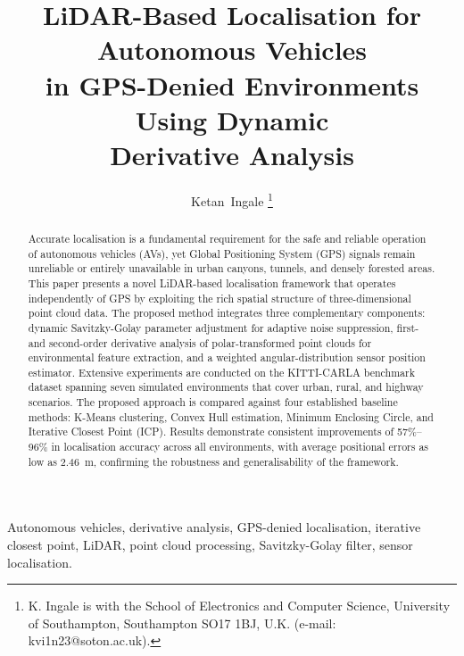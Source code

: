 \documentclass[lettersize,journal]{IEEEtran}
\begin{document}

\title{LiDAR-Based Localisation for Autonomous Vehicles\\
in GPS-Denied Environments Using Dynamic\\
Derivative Analysis}

\author{Ketan~Ingale
\thanks{K. Ingale is with the School of Electronics and Computer Science,
University of Southampton, Southampton SO17 1BJ, U.K.
(e-mail: kvi1n23@soton.ac.uk).}}

\maketitle

\begin{abstract}
Accurate localisation is a fundamental requirement for the safe and reliable operation of
autonomous vehicles (AVs), yet Global Positioning System (GPS) signals remain
unreliable or entirely unavailable in urban canyons, tunnels, and densely forested areas.
This paper presents a novel LiDAR-based localisation framework that operates
independently of GPS by exploiting the rich spatial structure of three-dimensional point
cloud data. The proposed method integrates three complementary components: dynamic
Savitzky-Golay parameter adjustment for adaptive noise suppression, first- and
second-order derivative analysis of polar-transformed point clouds for environmental
feature extraction, and a weighted angular-distribution sensor position estimator.
Extensive experiments are conducted on the KITTI-CARLA benchmark dataset spanning
seven simulated environments that cover urban, rural, and highway scenarios. The
proposed approach is compared against four established baseline methods: K-Means
clustering, Convex Hull estimation, Minimum Enclosing Circle, and Iterative Closest
Point (ICP). Results demonstrate consistent improvements of 57\%--96\% in localisation
accuracy across all environments, with average positional errors as low as 2.46~m,
confirming the robustness and generalisability of the framework.
\end{abstract}

\begin{IEEEkeywords}
Autonomous vehicles, derivative analysis, GPS-denied localisation, iterative closest
point, LiDAR, point cloud processing, Savitzky-Golay filter, sensor localisation.
\end{IEEEkeywords}
\end{document}
